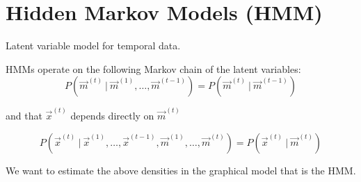 \section{Hidden Markov Models (HMM)}

\begin{frame} 
    \begin{center}
    Latent variable model for temporal data.
    \end{center}
	
\end{frame}

\begin{frame}{\secname}

HMMs operate on the following Markov chain of the latent variables:
\begin{equation}
P(\vec{m}^{(t)}  ~|~ \vec{m}^{(1)},  \dots,\vec{m}^{(t-1)}) =
		P(\vec{m}^{(t)}  ~|~ \vec{m}^{(t-1)})
\end{equation}

and that $\vec x^{(t)}$ depends directly on $\vec m^{(t)}$

\begin{equation}
P(\vec{x}^{(t)}  ~|~ \vec{x}^{(1)},  \dots,\vec{x}^{(t-1)}, \vec{m}^{(1)},  \dots,\vec{m}^{(t)}) =
		P(\vec{x}^{(t)}  ~|~ \vec{m}^{(t)})
\end{equation}

We want to estimate the above densities in the graphical model that is the HMM.

\end{frame}

